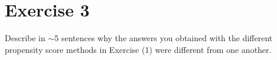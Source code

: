 
\section{Exercise 3}

\begin{quoting}
  Describe in $\sim$5 sentences why the answers you obtained with the
  different propensity score methods in Exercise (1) were different
  from one another.
\end{quoting}


